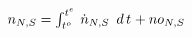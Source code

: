\documentclass[border=2pt]{standalone}
\begin{document}
${n}{_{N, S}}=\int_{ {{t^o}}{_{}} }^{ {{t^e}}{_{}} } \, {{\dot{n}}}{_{N, S}} \enskip d\,{t}{_{}}  + {no}{_{N, S}}$
\end{document}
